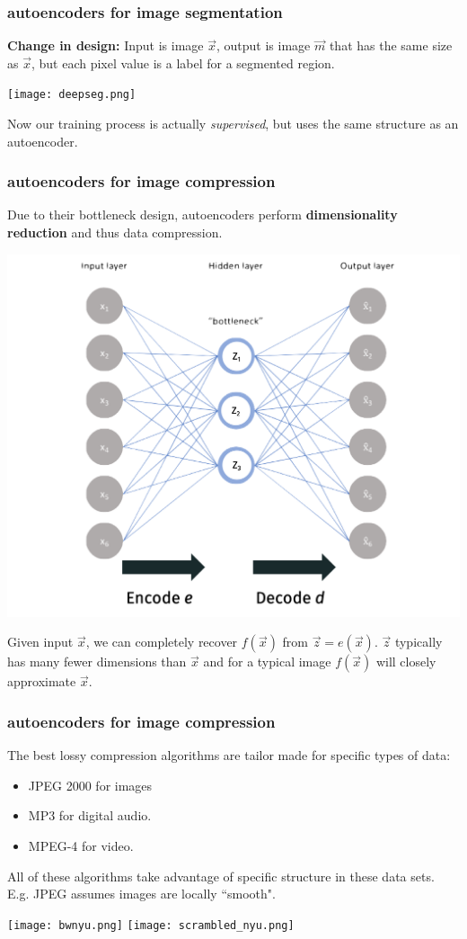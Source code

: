\documentclass[handout,compress]{beamer}
\begin{document}
\begin{frame}
	\frametitle{autoencoders for image segmentation}
	\textbf{Change in design:} Input is image $\vec{x}$, output is image $\vec{m}$ that has the same size as $\vec{x}$, but each pixel value is a label for a segmented region.
	\begin{center}
		\texttt{[image: deepseg.png]}
	\end{center}
Now our training process is actually \emph{supervised}, but uses the same structure as an autoencoder.
\end{frame}

\begin{frame}
	\frametitle{autoencoders for image compression}
	Due to their bottleneck design, autoencoders perform \textbf{dimensionality reduction} and thus data compression. 
	\begin{center}
		\includegraphics[width=.5\textwidth]{labeled_bottleneck.png}
	\end{center}
Given input $\vec{x}$, we can completely recover $f(\vec{x})$ from $\vec{z} = e(\vec{x})$. $\vec{z}$ typically has many fewer dimensions than $\vec{x}$ and for a typical image $f(\vec{x})$ will closely approximate $\vec{x}$.  
\end{frame}

\begin{frame}
	\frametitle{autoencoders for image compression}
	\small
	The best lossy compression algorithms are tailor made for specific types of data:\vspace{-.5em}
	\begin{itemize}
		\item JPEG 2000 for images
		\item MP3 for digital audio.
		\item MPEG-4 for video.
	\end{itemize}\vspace{-.5em}
	All of these algorithms take advantage of specific structure in these data sets. E.g. JPEG  assumes images are locally ``smooth".
	\begin{center}
		\texttt{[image: bwnyu.png]}\hspace{4em} \texttt{[image: scrambled\_nyu.png]}
	\end{center}
\end{frame}
\end{document}

